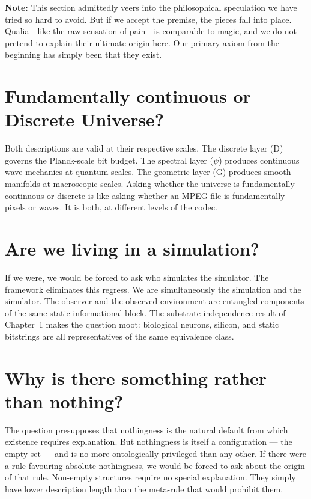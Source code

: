 \textbf{Note:}
This section admittedly veers into the philosophical speculation we have tried so hard to avoid.
But if we accept the premise, the pieces fall into place.
Qualia—like the raw sensation of pain—is comparable to magic, and we do not pretend to explain
their ultimate origin here.
Our primary axiom from the beginning has simply been that they exist.


\section{Fundamentally continuous or Discrete Universe?}

Both descriptions are valid at their respective scales. The discrete
layer (D) governs the Planck-scale bit budget. The spectral layer
($\psi$) produces continuous wave mechanics at quantum scales. The
geometric layer (G) produces smooth manifolds at macroscopic scales.
Asking whether the universe is fundamentally continuous or discrete is
like asking whether an MPEG file is fundamentally pixels or waves. It
is both, at different levels of the codec.


\section{Are we living in a simulation?}

If we were, we would be forced to ask who simulates the simulator. The
framework eliminates this regress. We are simultaneously the simulation
and the simulator. The observer and the observed environment are
entangled components of the same static informational block. The
substrate independence result of Chapter~1 makes the question moot:
biological neurons, silicon, and static bitstrings are all
representatives of the same equivalence class.

\section{Why is there something rather than nothing?}

The question presupposes that nothingness is the natural default from
which existence requires explanation. But nothingness is itself a
configuration --- the empty set --- and is no more ontologically
privileged than any other. If there were a rule favouring absolute
nothingness, we would be forced to ask about the origin of that rule.
Non-empty structures require no special explanation. They simply have
lower description length than the meta-rule that would prohibit them.


